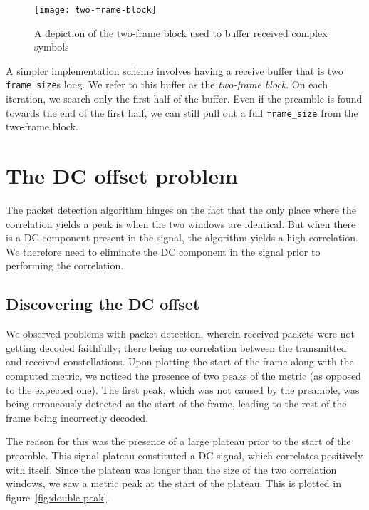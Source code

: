 \begin{figure}[h]
	\centering
	\texttt{[image: two-frame-block]}
	\caption{A depiction of the two-frame block used to buffer received complex
	         symbols}
	\label{fig:two-frame-block}
\end{figure}

A simpler implementation scheme involves having a receive buffer that is two
\verb+frame_size+s long. We refer to this buffer as the \emph{two-frame block}.
On each iteration, we search only the first half of the buffer. Even if the
preamble is found towards the end of the first half, we can still pull out a
full \verb+frame_size+ from the two-frame block.


\section{The DC offset problem}

The packet detection algorithm hinges on the fact that the only place where
the correlation yields a peak is when the two windows are identical. But when
there is a DC component present in the signal, the algorithm yields a high
correlation. We therefore need to eliminate the DC component in the signal
prior to performing the correlation.

\subsection{Discovering the DC offset}

We observed problems with packet detection, wherein received packets were not
getting decoded faithfully; there being no correlation between the transmitted
and received constellations. Upon plotting the start of the frame along with
the computed metric, we noticed the presence of two peaks of the metric (as
opposed to the expected one). The first peak, which was not caused by the
preamble, was being erroneously detected as the start of the frame, leading to
the rest of the frame being incorrectly decoded.

The reason for this was the presence of a large plateau prior to the start of
the preamble. This signal plateau constituted a DC signal, which correlates
positively with itself. Since the plateau was longer than the size of the two
correlation windows, we saw a metric peak at the start of the plateau. This is
plotted in figure~\ref{fig:double-peak}.

